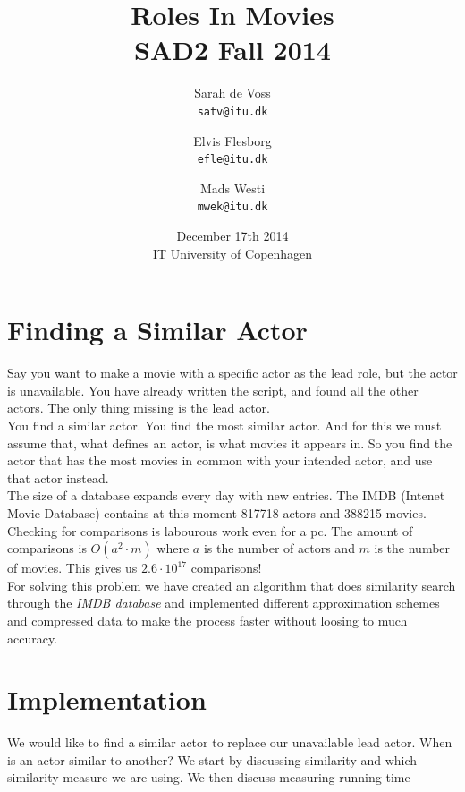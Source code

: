 \documentclass[a4paper,11pt]{article}
\begin{document}
\setlength{\parindent}{0cm}
\setlength{\unitlength}{1mm}
\date{December 17th 2014\\ IT University of Copenhagen}
\title{Roles In Movies\\SAD2 Fall 2014}

\author{Sarah de Voss\\
\texttt{satv@itu.dk}
\and Elvis Flesborg\\
\texttt{efle@itu.dk}
\and Mads Westi\\
\texttt{mwek@itu.dk}}
\clearpage\maketitle

\thispagestyle{empty}
\newpage
\tableofcontents
\thispagestyle{empty}
\newpage

\setcounter{page}{1}
\section{Finding a Similar Actor}

Say you want to make a movie with a specific actor as the lead role, but the actor is unavailable. You have already written the script, and found all the other actors. The only thing missing is the lead actor. \\

You find a similar actor. You find the most similar actor. And for this we must assume that, what defines an actor, is what movies it appears in. So you find the actor that has the most movies in common with your intended actor, and use that actor instead. \\

The size of a database expands every day with new entries. The IMDB (Intenet Movie Database) contains at this moment 817718 actors and 388215 movies. Checking for comparisons is labourous work even for a pc. The amount of comparisons is $O(a^2\cdot m)$ where $a$ is the number of actors and $m$ is the number of movies. This gives us $2.6\cdot 10^{17}$ comparisons!\\

For solving this problem we have created an algorithm that does similarity search through the \emph{IMDB database} and implemented different approximation schemes and compressed data to make the process faster without loosing to much accuracy.


\section{Implementation}
We would like to find a similar actor to replace our unavailable lead actor. When is an actor similar to another? We start by discussing similarity and which similarity measure we are using. We then discuss measuring running time\\
\end{document}
